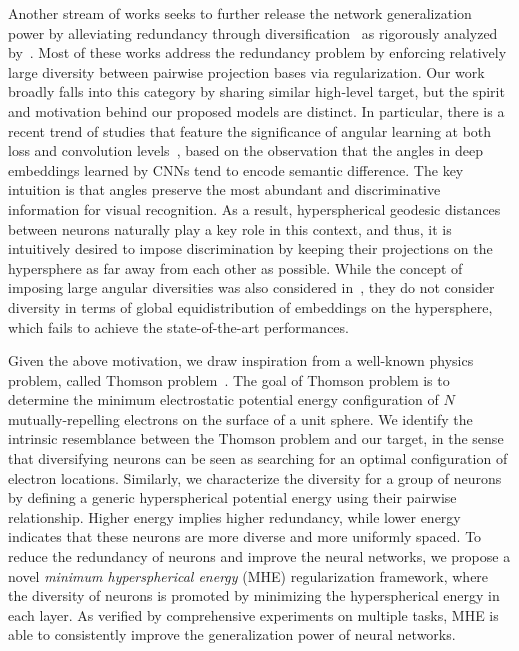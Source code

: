 \setcounter{footnote}{0}
\renewcommand\thefootnote{\arabic{footnote}}
\par
 Another stream of works seeks to further release the network generalization power by alleviating redundancy through diversification~\cite{xie2017uncorrelation,xie2017learning,cogswell2016reducing,rodriguez2017regularizing} as rigorously analyzed by~\cite{xie2016diversity}. Most of these works address the redundancy problem by enforcing relatively large diversity between pairwise projection bases via regularization. Our work broadly falls into this category by sharing similar high-level target, but the spirit and motivation behind our proposed models are distinct. In particular, there is a recent trend of studies that feature the significance of angular learning at both loss and convolution levels~\cite{liu2016large,liu2017sphereface,liu2017hyper,liu2018decoupled}, based on the observation that the angles in deep embeddings learned by CNNs tend to encode semantic difference. The key intuition is that angles preserve the most abundant and discriminative information for visual recognition. As a result, hyperspherical geodesic distances between neurons naturally play a key role in this context, and thus, it is intuitively desired to impose discrimination by keeping their projections on the hypersphere as far away from each other as possible. While the concept of imposing large angular diversities was also considered in~\cite{xie2016diversity,xie2017uncorrelation,xie2017learning,rodriguez2017regularizing}, they do not consider diversity in terms of global equidistribution of embeddings on the hypersphere, which fails to achieve the state-of-the-art performances. 
\par
Given the above motivation, we draw inspiration from a well-known physics problem, called Thomson problem~\cite{thomson1904xxiv,smale1998mathematical}. The goal of Thomson problem is to determine the minimum electrostatic potential energy configuration of $N$ mutually-repelling electrons on the surface of a unit sphere. We identify the intrinsic resemblance between the Thomson problem and our target, in the sense that diversifying neurons can be seen as searching for an optimal configuration of electron locations. Similarly, we characterize the diversity for a group of neurons by defining a generic hyperspherical potential energy using their pairwise relationship. Higher energy implies higher redundancy, while lower energy indicates that these neurons are more diverse and more uniformly spaced. To reduce the redundancy of neurons and improve the neural networks, we propose a novel \emph{minimum hyperspherical energy} (MHE) regularization framework, where the diversity of neurons is promoted by minimizing the hyperspherical energy in each layer. As verified by comprehensive experiments on multiple tasks, MHE is able to consistently improve the  generalization power of neural networks.

